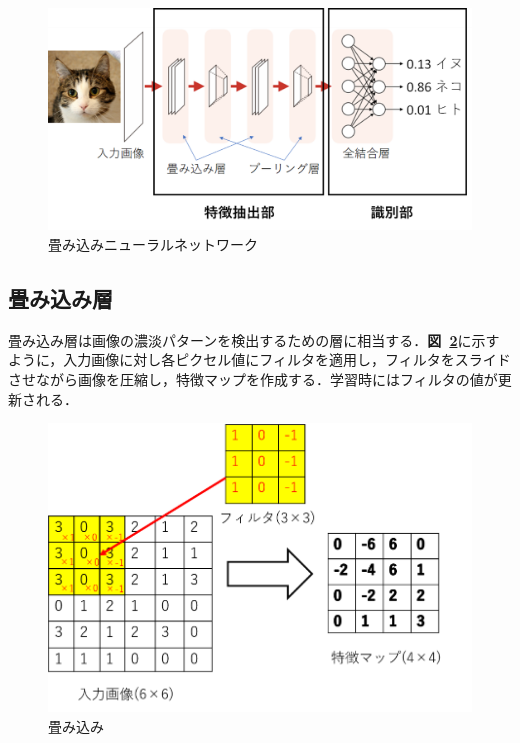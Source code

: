\documentclass[a4j, 11pt]{jreport}
\newcommand{\figref}[1]{\textbf{図~\ref{#1}}}
\begin{document}
\begin{figure}[htbp]
	\begin{center}
		\includegraphics[scale=1.0]{./images/deeplearning/CNN.png}
		\caption{畳み込みニューラルネットワーク}
		\label{fig:CNN}
	\end{center}
\end{figure}

\newpage
\subsection{畳み込み層}
畳み込み層は画像の濃淡パターンを検出するための層に相当する．\figref{fig:convolution}に示すように，入力画像に対し各ピクセル値にフィルタを適用し，フィルタをスライドさせながら画像を圧縮し，特徴マップを作成する．学習時にはフィルタの値が更新される．
\begin{figure}[htbp]
	\begin{center}
		\includegraphics[scale=0.83]{./images/deeplearning/convolution.png}
		\caption{畳み込み}
		\label{fig:convolution}
	\end{center}
\end{figure}
\vspace{-40pt}
\end{document}
